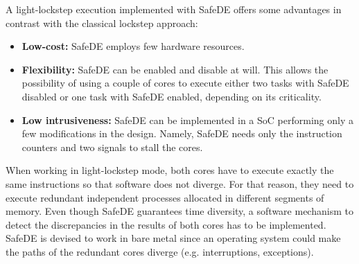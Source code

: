 A light-lockstep execution implemented with SafeDE offers some advantages in contrast with the classical lockstep approach:
\begin{itemize}
	\item \textbf{Low-cost:} SafeDE employs few hardware resources.
	\item \textbf{Flexibility:} SafeDE can be enabled and disable at will. This allows the possibility of using a couple of cores to execute either two tasks with SafeDE disabled or one task with SafeDE enabled, depending on its criticality.
        \item \textbf{Low intrusiveness:} SafeDE can be implemented in a SoC performing only a few modifications in the design. Namely, SafeDE needs only the instruction counters and two signals to stall the cores. 
\end{itemize}

When working in light-lockstep mode, both cores have to execute exactly the same instructions so that software does not diverge. For that reason, they need to execute redundant independent processes allocated in different segments of memory. Even though SafeDE guarantees time diversity, a software mechanism to detect the discrepancies in the results of both cores has to be implemented. SafeDE is devised to work in bare metal since an operating system could make the paths of the redundant cores diverge (e.g. interruptions, exceptions).

\hspace{5cm}

